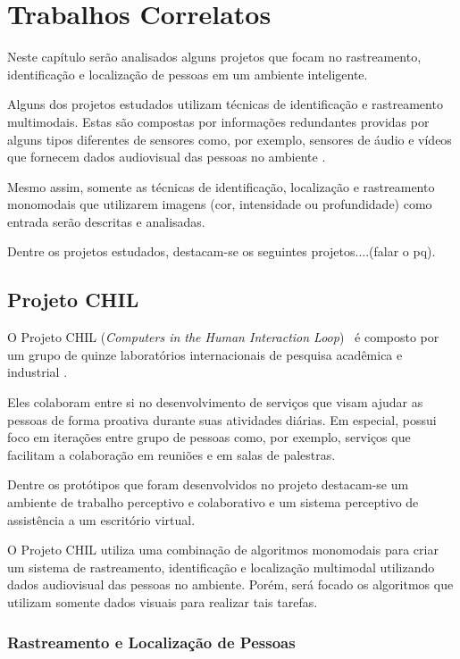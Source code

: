 \chapter{Trabalhos Correlatos}

Neste capítulo serão analisados alguns projetos que focam no rastreamento, identificação e localização de pessoas em um ambiente inteligente. 

Alguns dos projetos estudados utilizam técnicas de identificação e rastreamento multimodais. Estas são compostas por informações redundantes providas por alguns tipos diferentes de sensores como, por exemplo, sensores de áudio e vídeos que fornecem dados audiovisual  das pessoas no ambiente .

Mesmo assim, somente as técnicas de identificação, localização e rastreamento monomodais que utilizarem imagens (cor, intensidade ou profundidade) como entrada serão descritas e analisadas.

Dentre os projetos estudados, destacam-se os seguintes projetos....(falar o pq).

\section{Projeto CHIL}

O Projeto CHIL (\textit{Computers in the Human Interaction Loop})~\cite{chil} é composto por um grupo de quinze laboratórios internacionais de pesquisa acadêmica e industrial .

Eles colaboram entre si no desenvolvimento de serviços que visam ajudar as pessoas de forma proativa durante suas atividades diárias. Em especial, possui foco em iterações entre grupo de pessoas como, por exemplo, serviços que facilitam a colaboração em reuniões e em salas de palestras. 

Dentre os protótipos que foram desenvolvidos no projeto destacam-se um ambiente de trabalho perceptivo e colaborativo e um sistema perceptivo de assistência a um escritório virtual.

O Projeto CHIL utiliza uma combinação de algoritmos monomodais para criar um sistema de rastreamento, identificação e localização multimodal utilizando dados audiovisual das pessoas no ambiente. Porém, será focado os algoritmos que utilizam somente dados visuais para realizar tais tarefas.

\subsection{Rastreamento e Localização de Pessoas}

